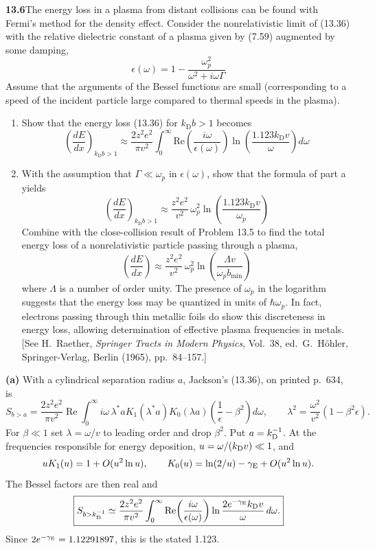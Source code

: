 \par\bigskip
\noindent\textbf{13.6}\quad The energy loss in a plasma from distant collisions can be found with Fermi's method for the density effect. Consider the nonrelativistic limit of (13.36) with the relative dielectric constant of a plasma given by (7.59) augmented by some damping,
\[
\epsilon(\omega)=1-\frac{\omega_{p}^{2}}{\omega^{2}+i\omega\Gamma}
\]
Assume that the arguments of the Bessel functions are small (corresponding to a speed of the incident particle large compared to thermal speeds in the plasma).
\begin{enumerate}
\item[(a)] Show that the energy loss (13.36) for $k_{\mathrm{D}}b>1$ becomes
\[
\left(\frac{dE}{dx}\right)_{k_{\mathrm{D}}b>1}\approx\frac{2z^{2}e^{2}}{\pi v^{2}}\int_{0}^{\infty}\mathrm{Re}\!\left(\frac{i\omega}{\epsilon(\omega)}\right)\ln\!\left(\frac{1.123k_{\mathrm{D}}v}{\omega}\right)d\omega
\]
\item[(b)] With the assumption that $\Gamma\ll\omega_{p}$ in $\epsilon(\omega)$, show that the formula of part a yields
\[
\left(\frac{dE}{dx}\right)_{k_{\mathrm{D}}b>1}\approx\frac{z^{2}e^{2}}{v^{2}}\,\omega_{p}^{2}\ln\!\left(\frac{1.123k_{\mathrm{D}}v}{\omega_{p}}\right)
\]
Combine with the close-collision result of Problem 13.5 to find the total energy loss of a nonrelativistic particle passing through a plasma,
\[
\left(\frac{dE}{dx}\right)\approx\frac{z^{2}e^{2}}{v^{2}}\,\omega_{p}^{2}\ln\!\left(\frac{\Lambda v}{\omega_{p}b_{\min}}\right)
\]
where $\Lambda$ is a number of order unity. The presence of $\omega_{p}$ in the logarithm suggests that the energy loss may be quantized in units of $\hbar\omega_{p}$. In fact, electrons passing through thin metallic foils do show this discreteness in energy loss, allowing determination of effective plasma frequencies in metals. [See H.~Raether, \emph{Springer Tracts in Modern Physics}, Vol.~38, ed.~G.~H\"ohler, Springer-Verlag, Berlin (1965), pp.~84--157.]
\end{enumerate}
\solution
\textbf{(a)} With a cylindrical separation radius $a$, Jackson's
(13.36), on printed p.~634, is
\[
 S_{b>a}=\frac{2z^2e^2}{\pi v^2}\operatorname{Re}
 \int_0^\infty i\omega\,\lambda^*aK_1(\lambda^*a)K_0(\lambda a)
       \left(\frac1{\epsilon}-\beta^2\right)d\omega,
 \qquad
 \lambda^2=\frac{\omega^2}{v^2}(1-\beta^2\epsilon).
\]
For $\beta\ll1$ set $\lambda=\omega/v$ to leading order and drop
$\beta^2$. Put $a=k_{\rm D}^{-1}$. At the frequencies responsible for
energy deposition, $u=\omega/(k_{\rm D}v)\ll1$, and
\[
 uK_1(u)=1+O(u^2\ln u),\qquad
 K_0(u)=\ln(2/u)-\gamma_{\rm E}+O(u^2\ln u).
\]
The Bessel factors are then real and
\[
 \boxed{S_{b>k_{\rm D}^{-1}}\simeq
 \frac{2z^2e^2}{\pi v^2}
 \int_0^\infty\operatorname{Re}\!\left(\frac{i\omega}{\epsilon(\omega)}\right)
 \ln\frac{2e^{-\gamma_{\rm E}}k_{\rm D}v}{\omega}\,d\omega.}
\]
Since $2e^{-\gamma_{\rm E}}=1.12291897$, this is the stated 1.123.

